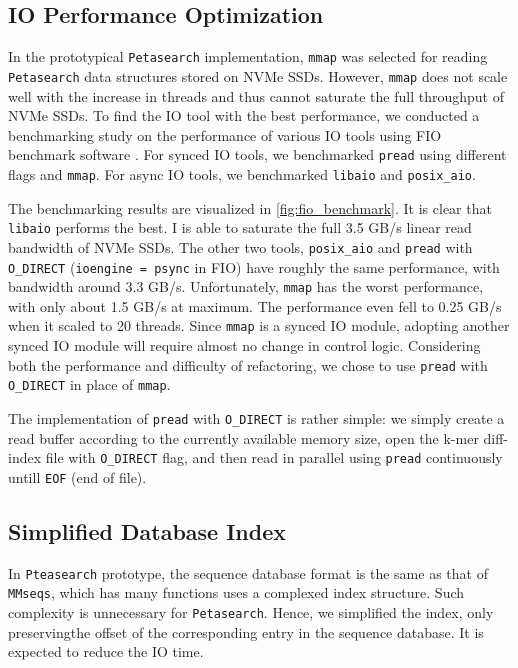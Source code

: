 \subsection{IO Performance Optimization}

In the prototypical \texttt{Petasearch} implementation, \texttt{mmap} was selected for reading \texttt{Petasearch} data structures stored on NVMe SSDs. However, \texttt{mmap} does not scale well with the increase in threads \cite{papagiannis2020optimizing} and thus cannot saturate the full throughput of NVMe SSDs. To find the IO tool with the best performance, we conducted a benchmarking study on the performance of various IO tools using FIO benchmark software \cite{AxboeFlexibleIOTester2022}. For synced IO tools, we benchmarked \texttt{pread} using different flags and \texttt{mmap}. For async IO tools, we benchmarked \texttt{libaio} and \texttt{posix\_aio}.

The benchmarking results are visualized in \autoref{fig:fio_benchmark}. It is clear that \texttt{libaio} performs the best. I is able to saturate the full 3.5 GB/s linear read bandwidth of NVMe SSDs. The other two tools, \texttt{posix\_aio} and \texttt{pread} with \texttt{O\_DIRECT} (\texttt{ioengine = psync} in FIO) have roughly the same performance, with bandwidth around 3.3 GB/s. Unfortunately, \texttt{mmap} has the worst performance, with only about 1.5 GB/s at maximum. The performance even fell to 0.25 GB/s when it scaled to 20 threads. Since \texttt{mmap} is a synced IO module, adopting another synced IO module will require almost no change in control logic. Considering both the performance and difficulty of refactoring, we chose to use \texttt{pread} with \texttt{O\_DIRECT} in place of \texttt{mmap}.

The implementation of \texttt{pread} with \texttt{O\_DIRECT} is rather simple: we simply create a read buffer according to the currently available memory size, open the k-mer diff-index file with \texttt{O\_DIRECT} flag, and then read in parallel using \texttt{pread} continuously untill \texttt{EOF} (end of file).

\subsection{Simplified Database Index}

In \texttt{Pteasearch} prototype, the sequence database format is the same as that of \texttt{MMseqs}, which has many functions uses a complexed index structure. Such complexity is unnecessary for \texttt{Petasearch}. Hence, we simplified the index, only preservingthe offset of the corresponding entry in the sequence database. It is expected to reduce the IO time.

